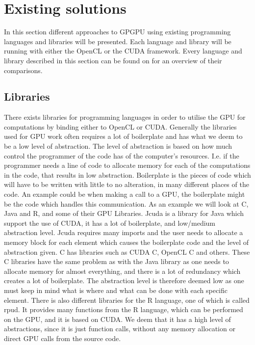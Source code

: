 \section{Existing solutions} %
\label{sec:state_of_the_art}
In this section different approaches to GPGPU using existing programming languages and libraries will be presented.
Each language and library will be running with either the OpenCL or the CUDA framework.
Every language and library described in this section can be found on  for an overview of their comparisons.
      
\subsection{Libraries} 
There exists libraries for programming languages in order to utilise the GPU for computations by binding either to OpenCL or CUDA.
Generally the libraries used for GPU work often requires a lot of boilerplate and has what we deem to be a low level of abstraction.
The level of abstraction is based on how much control the programmer of the code has of the computer's resources.
I.e. if the programmer needs a line of code to allocate memory for each of the computations in the code, that results in low abstraction.
Boilerplate is the pieces of code which will have to be written with little to no alteration, in many different places of the code.
An example could be when making a call to a GPU, the boilerplate might be the code which handles this communication.
As an example we will look at C, Java and R, and some of their GPU Libraries.
Jcuda is a library for Java which support the use of CUDA, it has a lot of boilerplate, and low/medium abstraction level\citep{Java_library}. 
Jcuda requires many imports and the user needs to allocate a memory block for each element which causes the boilerplate code and the level of abstraction given.\citep{Java_malloc}
C has libraries such as CUDA C, OpenCL C and others.
These C libraries have the same problem as with the Java library as one needs to allocate memory for almost everything, and there is a lot of redundancy which creates a lot of boilerplate.
The abstraction level is therefore deemed low as one must keep in mind what is where and what can be done with each specific element.\citep{C_CUDA} 
There is also different libraries for the R language, one of which is called rpud.
It provides many functions from the R language, which can be performed on the GPU, and it is based on CUDA.
We deem that it has a high level of abstractions, since it is just function calls, without any memory allocation or direct GPU calls from the source code. \citep{Rcuda}                                                 

